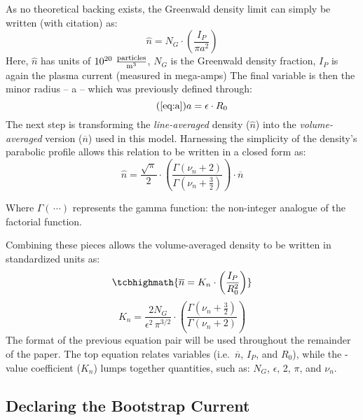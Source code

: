 As no theoretical backing exists, the Greenwald density limit can simply be written (with citation) as: \cite{greenwald}
\begin{equation}
	\hat n = N_G \cdot \left( \frac{ I_P }{ \pi a^2} \right)
\end{equation}
Here, $\hat n$ has units of $10^{20} \ \frac{\textnormal{particles}}{\textnormal{m}^3}$, $N_G$ is the Greenwald density fraction,  $I_P$ is again the plasma current (measured in mega-amps)  The final variable is then the minor radius -- a -- which was previously defined through:
\begin{equation}
	\tag{\ref{eq:a}}
	a = \epsilon \cdot R_0
\end{equation}
The next step is transforming the \emph{line-averaged} density ($\hat n$) into the \emph{volume-averaged} version ($\overline n$) used in this model. Harnessing the simplicity of the density's parabolic profile allows this relation to be written in a closed form as:
 \begin{equation}
 	\hat n = \frac{\sqrt{\pi}}{2} \cdot \left( \frac{\Gamma \left( \nu_n + 2 \right)}{\Gamma \left( \nu_n + \frac{3}{2} \right)} \right) \cdot \overline n
 \end{equation}

 Where $\Gamma( \, \cdots)$ represents the gamma function: the non-integer analogue of the factorial function.

 Combining these pieces allows the volume-averaged density to be written in standardized units  as:
\begin{equation}
 	\label{eq:greenwald}
 	\tcbhighmath{
 	\overline n = K_n \cdot \left( \frac{I_P}{R_0^2} \right)
 	}
\end{equation}
 \begin{equation}
 	K_n = \frac{2 N_G}{\epsilon^2 \, \pi^{3/2} } \cdot \left( \frac{\Gamma \left( \nu_n + \frac{3}{2} \right)}{\Gamma \left( \nu_n + 2 \right)} \right)
\end{equation}
The format of the previous equation pair will be used throughout the remainder of the paper. The top equation relates  variables (i.e.\ $\overline n$, $I_P$, and $R_0$), while the -value coefficient ($K_n$) lumps together  quantities, such as: $N_G$, $\epsilon$, 2, $\pi$, and $\nu_n$.

\subsection{Declaring the Bootstrap Current}

